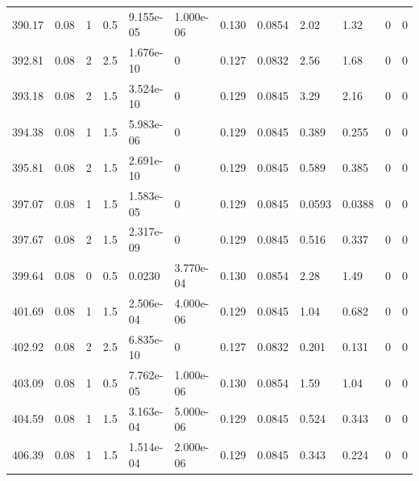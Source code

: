 \documentclass[preview]{standalone}
\begin{document}
{{{{{{\begin{tabular}{L{1.2cm}C{1.2cm} C{0.3cm}C{0.5cm} C{1.4cm}C{1.4cm} C{1.4cm}C{1.4cm} C{1.6cm}C{1.6cm} C{1.6cm}C{1.6cm}}
  390.17  &  0.08  & 1     & 0.5 &  9.155e-05  & 1.000e-06  &  0.130&   0.0854& 2.02 & 1.32   &  0 & 0  \\ 
  392.81  &  0.08  & 2     & 2.5 &  1.676e-10  & 0  &  0.127&   0.0832& 2.56 & 1.68   &  0 & 0  \\ 
  393.18  &  0.08  & 2     & 1.5 &  3.524e-10  & 0  &  0.129&   0.0845& 3.29 & 2.16   &  0 & 0  \\ 
  394.38  &  0.08  & 1     & 1.5 &  5.983e-06  & 0  &  0.129&   0.0845& 0.389 & 0.255   &  0 & 0  \\ 
  395.81  &  0.08  & 2     & 1.5 &  2.691e-10  & 0  &  0.129&   0.0845& 0.589 & 0.385   &  0 & 0  \\ 
  397.07  &  0.08  & 1     & 1.5 &  1.583e-05  & 0  &  0.129&   0.0845& 0.0593 & 0.0388   &  0 & 0  \\ 
  397.67  &  0.08  & 2     & 1.5 &  2.317e-09  & 0  &  0.129&   0.0845& 0.516 & 0.337   &  0 & 0  \\ 
  399.64  &  0.08  & 0     & 0.5 &  0.0230  & 3.770e-04  &  0.130&   0.0854& 2.28 & 1.49   &  0 & 0  \\ 
  401.69  &  0.08  & 1     & 1.5 &  2.506e-04  & 4.000e-06  &  0.129&   0.0845& 1.04 & 0.682   &  0 & 0  \\ 
  402.92  &  0.08  & 2     & 2.5 &  6.835e-10  & 0  &  0.127&   0.0832& 0.201 & 0.131   &  0 & 0  \\ 
  403.09  &  0.08  & 1     & 0.5 &  7.762e-05  & 1.000e-06  &  0.130&   0.0854& 1.59 & 1.04   &  0 & 0  \\ 
  404.59  &  0.08  & 1     & 1.5 &  3.163e-04  & 5.000e-06  &  0.129&   0.0845& 0.524 & 0.343   &  0 & 0  \\ 
  406.39  &  0.08  & 1     & 1.5 &  1.514e-04  & 2.000e-06  &  0.129&   0.0845& 0.343 & 0.224   &  0 & 0  \\ 
\hline 
\end{tabular} 

}}}}}}
\end{document}
